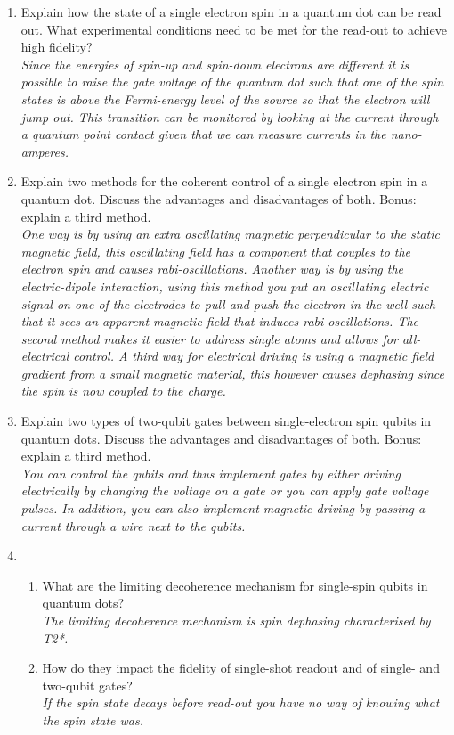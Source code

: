 \documentclass[a4paper]{scrartcl}
\newcommand{\qa}[2]{#1\\ \textit{#2}}
\begin{document}
\begin{enumerate}[label=(\alph*)]
  \item \qa{Explain how the state of a single electron spin in a quantum dot can be read out. What experimental conditions need to be met for the read-out to achieve high fidelity?}{Since the energies of spin-up and spin-down electrons are different it is possible to raise the gate voltage of the quantum dot such that one of the spin states is above the Fermi-energy level of the source so that the electron will jump out. This transition can be monitored by looking at the current through a quantum point contact given that we can measure currents in the nano-amperes.}
  \item \qa{Explain two methods for the coherent control of a single electron spin in a quantum dot. Discuss the advantages and disadvantages of both. Bonus: explain a third method.}{One way is by using an extra oscillating magnetic perpendicular to the static magnetic field, this oscillating field has a component that couples to the electron spin and causes rabi-oscillations. Another way is by using the electric-dipole interaction, using this method you put an oscillating electric signal on one of the electrodes to pull and push the electron in the well such that it sees an apparent magnetic field that induces rabi-oscillations. The second method makes it easier to address single atoms and allows for all-electrical control. A third way for electrical driving is using a magnetic field gradient from a small magnetic material, this however causes dephasing since the spin is now coupled to the charge.}
  \item \qa{Explain two types of two-qubit gates between single-electron spin qubits in quantum dots. Discuss the advantages and disadvantages of both. Bonus: explain a third method.}{You can control the qubits and thus implement gates by either driving electrically by changing the voltage on a gate or you can apply gate voltage pulses. In addition, you can also implement magnetic driving by passing a current through a wire next to the qubits.}
  \item \begin{enumerate}[label=(\roman*)]
    \item \qa{What are the limiting decoherence mechanism for single-spin qubits in quantum dots?}{The limiting decoherence mechanism is spin dephasing characterised by T2*.}
    \item \qa{How do they impact the fidelity of single-shot readout and of single- and two-qubit gates?}{If the spin state decays before read-out you have no way of knowing what the spin state was.}

\end{enumerate}
\end{enumerate}
\end{document}
